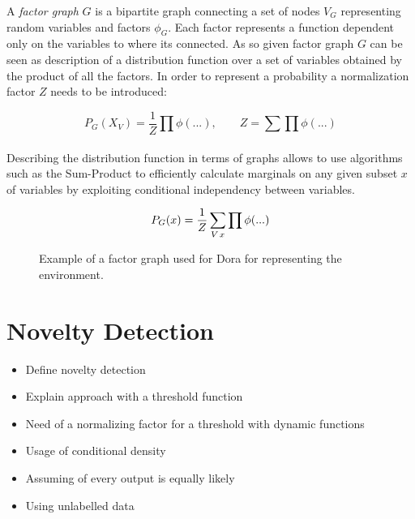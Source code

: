 \documentclass[runningheads,a4paper]{llncs}
\begin{document}
A \emph{factor graph} $G$ is a bipartite graph connecting a set of nodes $V_G$ representing
random variables and factors $\phi_G$.
Each factor represents a function dependent only on the variables to where its connected.
As so given factor graph $G$ can be seen as description of a distribution function over a set
of variables obtained by the product of all the factors. In order to represent a probability
a normalization factor $Z$ needs to be introduced:

\begin{equation}
P_G(X_V) = \frac{1}{Z}\prod_{}{\phi(...)},\qquad Z = \sum\prod{\phi(...)}
\end{equation}

Describing the distribution function in terms of graphs allows to use algorithms such as the
Sum-Product to efficiently calculate marginals on any given subset $x$ of variables by
exploiting conditional independency between variables.

\begin{equation}
P_G(x) = \frac{1}{Z}\sum_{V \\ x}{\prod{\phi(...)}}
\end{equation}

\begin{figure}[h]
\centering
{}
\caption{Example of a factor graph used for Dora for representing the environment.}
\end{figure}

\section{Novelty Detection}
\begin{itemize}
\item Define novelty detection 
\item Explain approach with a threshold function
\item Need of a normalizing factor for a threshold with dynamic functions
\item Usage of conditional density
\item Assuming of every output is equally likely
\item Using unlabelled data
\end{itemize}
\end{document}
